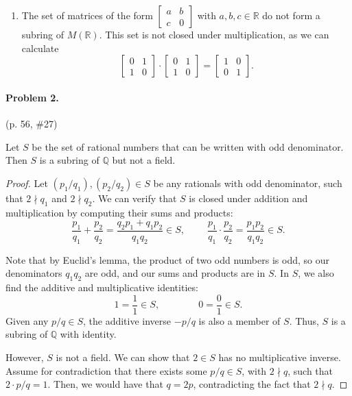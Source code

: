 \documentclass[12pt]{article}
\begin{document}
\begin{enumerate}
{        We also find a multiplicative identity $I_2 = \begin{bmatrix}1 & 0 \\ 0 & 1 \end{bmatrix}$ in our subring.
    }
    
    \item[c.] {
        The set of matrices of the form $\begin{bmatrix} a & b \\ c & 0\end{bmatrix}$ with $a,b,c \in \mathbb R$ do not form a subring of $M(\mathbb R)$. This set is not closed under multiplication, as we can calculate
        \[
            \begin{bmatrix}
                0 & 1 \\ 1 & 0
            \end{bmatrix} \cdot
            \begin{bmatrix}
                0 & 1 \\ 1 & 0
            \end{bmatrix} =
            \begin{bmatrix}
                1 & 0 \\ 0 & 1
            \end{bmatrix}.
        \]
    }
\end{enumerate}

\paragraph{Problem 2.} (p. 56, \#27)

Let $S$ be the set of rational numbers that can be written with odd denominator. Then $S$ is a subring of $\mathbb Q$ but not a field.

\begin{proof}
    Let $(p_1 / q_1), (p_2 / q_2) \in S$ be any rationals with odd denominator, such that $2 \nmid q_1$ and $2 \nmid q_2$. We can verify that $S$ is closed under addition and multiplication by computing their sums and products:
    \[ \frac{p_1}{q_1} + \frac{p_2}{q_2} = \frac{q_2 p_1 +  q_1 p_2}{q_1 q_2} \in S,
    \qquad\;
    \frac{p_1}{q_1} \cdot \frac{p_2}{q_2} = \frac{p_1 p_2}{q_1 q_2} \in S. 
    \] 

    Note that by Euclid's lemma, the product of two odd numbers is odd, so our denominators $q_1 q_2$ are odd, and our sums and products are in $S$. In $S$, we also find the additive and multiplicative identities:
    \[1 = \frac{1}{1} \in S, \qquad \qquad 0 = \frac{0}{1} \in S.\]
    Given any $p/q \in S$, the additive inverse $-p/q$ is also a member of $S$. Thus, $S$ is a subring of $\mathbb Q$ with identity. 
    
    However, $S$ is not a field. We can show that $2 \in S$ has no multiplicative inverse. Assume for contradiction that there exists some $p/q \in S$, with $2 \nmid q$, such that $2 \cdot p/q = 1$. Then, we would have that $q = 2p$, contradicting the fact that $2 \nmid q$.
\end{proof}
\end{document}
